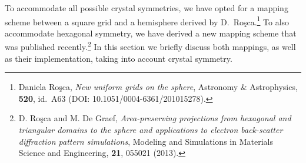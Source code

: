 \documentclass[DIV=calc, paper=letter, fontsize=11pt]{scrartcl}	 %
\begin{document}
To accommodate all possible crystal symmetries, we have opted for a mapping scheme between a square grid and a hemisphere derived by D.\ 
Ro\c{s}ca.\footnote{Daniela Ro\c{s}ca, \textit{New uniform grids on the sphere}, Astronomy \& Astrophysics, \textbf{520}, 
id.\ A63 (DOI: 10.1051/0004-6361/201015278).}
To also accommodate hexagonal symmetry, we have derived a new mapping scheme that was published recently.\footnote{D. Ro\c{s}ca and M. De Graef, 
\textit{Area-preserving projections from hexagonal and triangular domains to the sphere and applications to electron back-scatter diffraction pattern simulations}, 
Modeling and Simulations in Materials Science and Engineering, \textbf{21}, 055021 (2013).}  In this section we briefly discuss both mappings, as well 
as their implementation, taking into account crystal symmetry.
\end{document}
